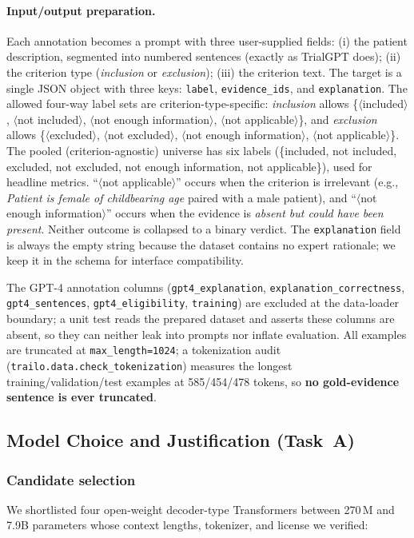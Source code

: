 \documentclass[conference]{IEEEtran}
\newcommand{\code}[1]{\texttt{\small #1}}
\begin{document}
\paragraph*{Input/output preparation.}
Each annotation becomes a prompt with three user-supplied fields:
(i) the patient description, segmented into numbered sentences
(exactly as TrialGPT does);
(ii) the criterion type (\emph{inclusion} or \emph{exclusion});
(iii) the criterion text. The target is a single JSON object with
three keys: \code{label}, \code{evidence\_ids}, and
\code{explanation}. The allowed four-way label sets are
criterion-type-specific:
\emph{inclusion} allows \{$\langle$included$\rangle$,
$\langle$not included$\rangle$,
$\langle$not enough information$\rangle$,
$\langle$not applicable$\rangle$\}, and
\emph{exclusion} allows \{$\langle$excluded$\rangle$,
$\langle$not excluded$\rangle$,
$\langle$not enough information$\rangle$,
$\langle$not applicable$\rangle$\}.
The pooled (criterion-agnostic) universe has six labels
(\{included, not included, excluded, not excluded, not enough
information, not applicable\}), used for headline metrics.
``$\langle$not applicable$\rangle$'' occurs when the criterion is
irrelevant (e.g., \emph{Patient is female of childbearing age}
paired with a male patient), and ``$\langle$not enough
information$\rangle$'' occurs when the evidence is
\emph{absent but could have been present}. Neither outcome is
collapsed to a binary verdict. The \code{explanation} field is
always the empty string because the dataset contains no expert
rationale; we keep it in the schema for interface compatibility.

The GPT-4 annotation columns
(\code{gpt4\_explanation}, \code{explanation\_correctness},
\code{gpt4\_sentences}, \code{gpt4\_eligibility}, \code{training})
are excluded at the data-loader boundary; a unit test reads the
prepared dataset and asserts these columns are absent, so they can
neither leak into prompts nor inflate evaluation. All examples are
truncated at \code{max\_length=1024}; a tokenization audit
(\code{trailo.data.check\_tokenization}) measures the longest
training/validation/test examples at 585/454/478 tokens, so
\textbf{no gold-evidence sentence is ever truncated}.

\subsection{Model Choice and Justification (Task~A)}
\label{sec:model}

\subsubsection{Candidate selection}
We shortlisted four open-weight decoder-type Transformers between
270\,M and 7.9B parameters whose context lengths, tokenizer, and
license we verified:
\end{document}
